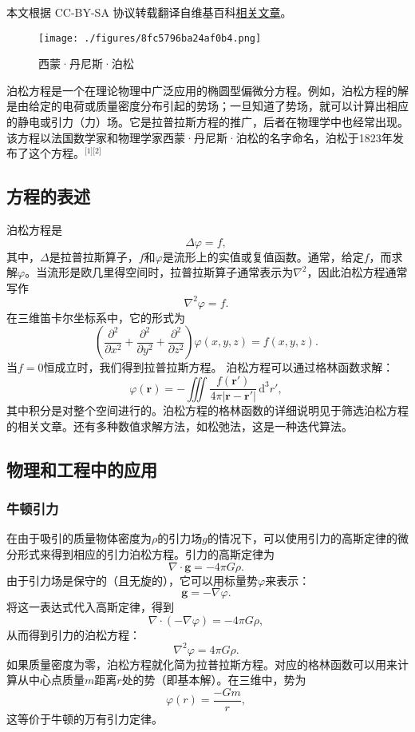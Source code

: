 
本文根据 CC-BY-SA 协议转载翻译自维基百科\href{https://en.wikipedia.org/wiki/Poisson\%27s_equation}{相关文章}。
\begin{figure}[ht]
\centering
\texttt{[image: ./figures/8fc5796ba24af0b4.png]}
\caption{西蒙·丹尼斯·泊松} \label{fig_BSFC_1}
\end{figure}
泊松方程是一个在理论物理中广泛应用的椭圆型偏微分方程。例如，泊松方程的解是由给定的电荷或质量密度分布引起的势场；一旦知道了势场，就可以计算出相应的静电或引力（力）场。它是拉普拉斯方程的推广，后者在物理学中也经常出现。该方程以法国数学家和物理学家西蒙·丹尼斯·泊松的名字命名，泊松于1823年发布了这个方程。\(^\text{[1][2]}\)
\subsection{方程的表述}  
泊松方程是  
\[
\Delta \varphi = f,~
\]
其中，\(\Delta\)是拉普拉斯算子，\(f\)和\(\varphi\)是流形上的实值或复值函数。通常，给定\(f\)，而求解\(\varphi\)。当流形是欧几里得空间时，拉普拉斯算子通常表示为\(\nabla^2\)，因此泊松方程通常写作  
\[
\nabla^2 \varphi = f.~
\]
在三维笛卡尔坐标系中，它的形式为  
\[
\left( \frac{\partial^2}{\partial x^2} + \frac{\partial^2}{\partial y^2} + \frac{\partial^2}{\partial z^2} \right) \varphi (x, y, z) = f (x, y, z).~
\]
当\(f = 0\)恒成立时，我们得到拉普拉斯方程。
泊松方程可以通过格林函数求解：  
\[
\varphi(\mathbf{r}) = - \iiint \frac{f(\mathbf{r'})}{4 \pi |\mathbf{r} - \mathbf{r'}|} \, \mathrm{d}^3 r',~
\]
其中积分是对整个空间进行的。泊松方程的格林函数的详细说明见于筛选泊松方程的相关文章。还有多种数值求解方法，如松弛法，这是一种迭代算法。
\subsection{物理和工程中的应用}  
\subsubsection{牛顿引力}   
在由于吸引的质量物体密度为\(\rho\)的引力场\(g\)的情况下，可以使用引力的高斯定律的微分形式来得到相应的引力泊松方程。引力的高斯定律为  
\[
\nabla \cdot \mathbf{g} = -4\pi G \rho.~
\]
由于引力场是保守的（且无旋的），它可以用标量势\(\varphi\)来表示：  
\[
\mathbf{g} = - \nabla \varphi.~
\]
将这一表达式代入高斯定律，得到  
\[
\nabla \cdot (-\nabla \varphi) = -4\pi G \rho,~
\]  
从而得到引力的泊松方程：  
\[
\nabla^2 \varphi = 4\pi G \rho.~
\]
如果质量密度为零，泊松方程就化简为拉普拉斯方程。对应的格林函数可以用来计算从中心点质量\(m\)距离\(r\)处的势（即基本解）。在三维中，势为  
\[
\varphi (r) = \frac{-Gm}{r},~
\]  
这等价于牛顿的万有引力定律。
